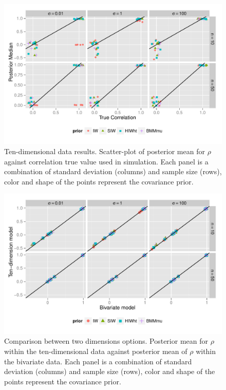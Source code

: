 \documentclass{article}
\begin{document}
\begin{figure}[hbpt]
   \centering
   \includegraphics[width=\textwidth]{fig_rho_d10} %
    \vspace{-.5in}
   \caption{ Ten-dimensional data results. Scatter-plot of posterior mean for $\rho$  against correlation true value used in simulation. Each panel is a combination of standard deviation (columns) and sample size (rows),  color and shape of the points represent the covariance prior. \label{rhod10} }
\end{figure}

\begin{figure}[hbpt]
   \centering
   \includegraphics[width=\textwidth]{fig_d2d10} %
    \vspace{-.5in}
   \caption{ Comparison between two dimensions options. Posterior mean for $\rho$ within the ten-dimensional data against posterior mean of $\rho$ within the bivariate data. Each panel is a combination of standard deviation (columns) and sample size (rows),  color and shape of the points represent the covariance prior.\label{d2d10} }
\end{figure}
\end{document}
